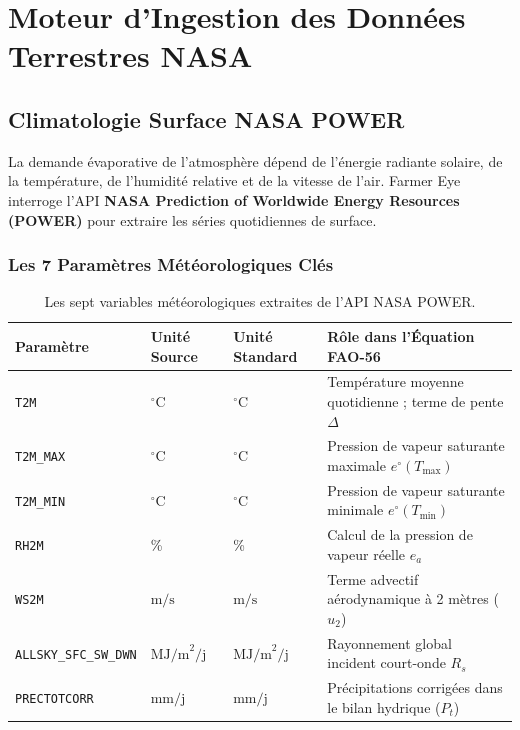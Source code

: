 \documentclass[11pt,a4paper,oneside]{report}
\begin{document}
\chapter{Moteur d'Ingestion des Données Terrestres NASA}

\section{Climatologie Surface NASA POWER}
La demande évaporative de l'atmosphère dépend de l'énergie radiante solaire, de la température, de l'humidité relative et de la vitesse de l'air. Farmer Eye interroge l'API \textbf{NASA Prediction of Worldwide Energy Resources (POWER)} pour extraire les séries quotidiennes de surface.

\subsection{Les 7 Paramètres Météorologiques Clés}
\begin{table}[h!]
\centering
\small
\begin{tabularx}{\linewidth}{lllX}
\toprule
\textbf{Paramètre} & \textbf{Unité Source} & \textbf{Unité Standard} & \textbf{Rôle dans l'Équation FAO-56} \\
\midrule
\texttt{T2M} & $^\circ\text{C}$ & $^\circ\text{C}$ & Température moyenne quotidienne ; terme de pente $\Delta$ \\
\texttt{T2M\_MAX} & $^\circ\text{C}$ & $^\circ\text{C}$ & Pression de vapeur saturante maximale $e^\circ(T_{\max})$ \\
\texttt{T2M\_MIN} & $^\circ\text{C}$ & $^\circ\text{C}$ & Pression de vapeur saturante minimale $e^\circ(T_{\min})$ \\
\texttt{RH2M} & \% & \% & Calcul de la pression de vapeur réelle $e_a$ \\
\texttt{WS2M} & $\text{m/s}$ & $\text{m/s}$ & Terme advectif aérodynamique à 2 mètres ($u_2$) \\
\texttt{ALLSKY\_SFC\_SW\_DWN} & $\text{MJ/m}^2/\text{j}$ & $\text{MJ/m}^2/\text{j}$ & Rayonnement global incident court-onde $R_s$ \\
\texttt{PRECTOTCORR} & $\text{mm/j}$ & $\text{mm/j}$ & Précipitations corrigées dans le bilan hydrique ($P_t$) \\
\bottomrule
\end{tabularx}
\caption{Les sept variables météorologiques extraites de l'API NASA POWER.}
\end{table}
\end{document}
